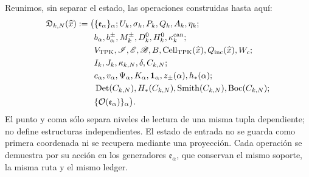 Reunimos, sin separar el estado, las operaciones construidas hasta aquí:
\begin{equation}
\label{rm:eq:pdfv2-cor-constructor-unico}
 \begin{aligned}
 \mathfrak D_{k,N}(\widehat x):=\bigl(&
 \{\mathfrak e_\alpha\}_\alpha;
 U_k,\sigma_k,P_k,Q_k,A_k,\eta_k;\\
 &b_\alpha,b_\alpha^\pm,M_k^\pm,D_k^0,H_k^0,
 \kappa_k^{\rm can};\\
 &V_{\rm TPK},\mathscr I,\mathscr E,\mathscr B,B,
 \operatorname{Cell}_{\rm TPK}(\widehat x),Q_{\rm inc}(\widehat x),W_c;\\
 &I_k,J_k,\kappa_{k,N},\delta,C_{k,N};\\
 &c_\alpha,v_\alpha,\Psi_\alpha,K_\alpha,
 \mathbf1_\alpha,z_\pm(\alpha),h_*(\alpha);\\
 &
 \operatorname{Det}(C_{k,N}),H_*(C_{k,N}),
 \operatorname{Smith}(C_{k,N}),\operatorname{Boc}(C_{k,N})
 ;\\
 &\{\mathcal O(\mathfrak e_\alpha)\}_\alpha
 \bigr).
 \end{aligned}
\end{equation}
El punto y coma sólo separa niveles de lectura de una misma tupla dependiente;
no define estructuras independientes. El estado de entrada no se guarda como
primera coordenada ni se recupera mediante una proyección. Cada operación se
demuestra por su acción en los generadores \(\mathfrak e_\alpha\), que
conservan el mismo soporte, la misma ruta y el mismo ledger.

